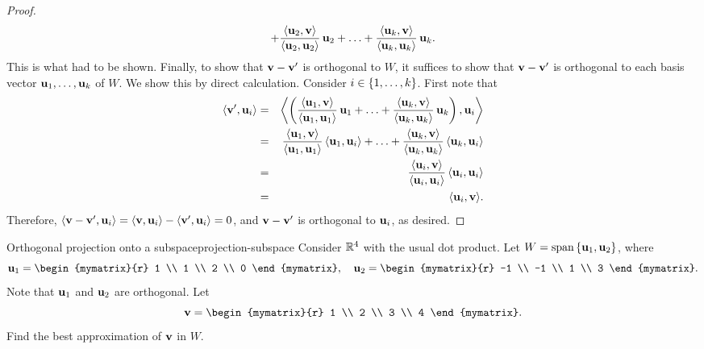 \begin{proof}
\begin{equation*}
    + \frac{\iprod{\vect{u}_2,\vect{v}}}{\iprod{\vect{u}_2,\vect{u}_2}}\,\vect{u}_2
    + \ldots
    + \frac{\iprod{\vect{u}_k,\vect{v}}}{\iprod{\vect{u}_k,\vect{u}_k}}\,\vect{u}_k.
  \end{equation*}
  This is what had to be shown. Finally, to show that
  $\vect{v}-\vect{v}'$ is orthogonal to $W$, it suffices to show that
  $\vect{v}-\vect{v}'$ is orthogonal to each basis vector
  $\vect{u}_1,\ldots,\vect{u}_k$ of $W$. We show this by direct calculation.
  Consider $i\in\left\{1,\ldots,k\right\}$. First note that
  \begin{eqnarray*}
    \iprod{\vect{v}',\vect{u}_i}
    &=& \bigiprod{\paren{
        \frac{\iprod{\vect{u}_1,\vect{v}}}{\iprod{\vect{u}_1,\vect{u}_1}}\,\vect{u}_1
        + \ldots
        + \frac{\iprod{\vect{u}_k,\vect{v}}}{\iprod{\vect{u}_k,\vect{u}_k}}\,\vect{u}_k}
        ,\vect{u}_i}\\
    &=&
        \frac{\iprod{\vect{u}_1,\vect{v}}}{\iprod{\vect{u}_1,\vect{u}_1}}\,\iprod{\vect{u}_1,\vect{u}_i}
        + \ldots
        + \frac{\iprod{\vect{u}_k,\vect{v}}}{\iprod{\vect{u}_k,\vect{u}_k}}\,\iprod{\vect{u}_k,\vect{u}_i}
    \\
    &=& \frac{\iprod{\vect{u}_i,\vect{v}}}{\iprod{\vect{u}_i,\vect{u}_i}}\,\iprod{\vect{u}_i,\vect{u}_i}\\
    &=& \iprod{\vect{u}_i,\vect{v}}.
  \end{eqnarray*}
  Therefore,
  $\iprod{\vect{v}-\vect{v}',\vect{u}_i} = \iprod{\vect{v},\vect{u}_i}
  - \iprod{\vect{v}',\vect{u}_i} = 0$, and $\vect{v}-\vect{v}'$ is
  orthogonal to $\vect{u}_i$, as desired.
\end{proof}

\begin{example}{Orthogonal projection onto a subspace}{projection-subspace}
  Consider $\mathbb{R}^4$ with the usual dot product. Let
  $W=\sspan\set{\vect{u}_1,\vect{u}_2}$, where
  \begin{equation*}
    \vect{u}_1 = \begin{mymatrix}{r} 1 \\ 1 \\ 2 \\ 0 \end{mymatrix}, \quad
    \vect{u}_2 = \begin{mymatrix}{r} -1 \\ -1 \\ 1 \\ 3 \end{mymatrix}.
  \end{equation*}
  Note that $\vect{u}_1$ and $\vect{u}_2$ are orthogonal. Let
  \begin{equation*}
    \vect{v} = \begin{mymatrix}{r} 1 \\ 2 \\ 3 \\ 4 \end{mymatrix}.
  \end{equation*}
  Find the best approximation of $\vect{v}$ in $W$.
\end{example}

